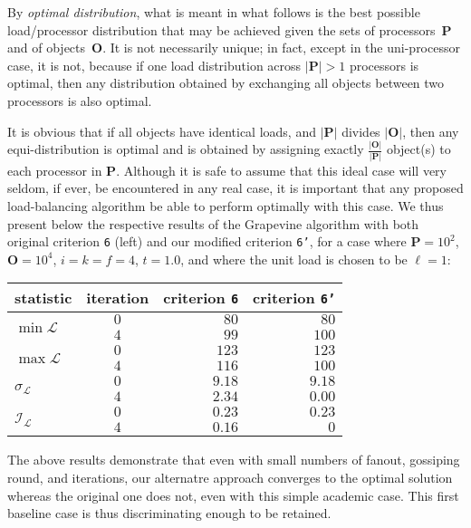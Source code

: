 By \emph{optimal distribution}, what is meant in what follows is
the best possible load/processor distribution that may be achieved given
the sets of processors~$\mathbf{P}$ and of objects~$\mathbf{O}$.
It is not necessarily unique; in fact, except in the uni-processor
case, it is not, because if one load distribution across
$\vert{\mathbf{P}}\vert>1$ processors is optimal, then any
distribution obtained by exchanging all objects between two processors
is also optimal.

It is obvious that if all objects have identical loads, and
$\vert\mathbf{P}\vert$ divides $\vert\mathbf{O}\vert$, then any
equi-distribution is optimal and is obtained by assigning exactly
$\tfrac{\vert\mathbf{O}\vert}{\vert\mathbf{P}\vert}$ object(s) to each
processor in $\mathbf{P}$.
Although it is safe to assume that this ideal case will very seldom,
if ever, be encountered in any real case, it is important that any
proposed load-balancing algorithm be able to perform optimally with
this case. We thus present below the respective results of the
Grapevine algorithm with both original criterion \texttt{6} (left) and
our modified criterion \texttt{6'}, for a case where
$\mathbf{P}=10^2$, $\mathbf{O}=10^4$, $i=k=f=4$, $t=1.0$, and where
the unit load is chosen to be $\ell=1$:
\begin{center}
\begin{tabular}{lcrr}
\hline
statistic & iteration & criterion \texttt{6} & criterion \texttt{6'} \\
\hline\hline
\multirow{2}{*}{$\min{\mathcal{L}}$}
&$0$ &$80$   &$80$   \\ &$4$ &$99$    &$100$ \\\hline
\multirow{2}{*}{$\max{\mathcal{L}}$}
&$0$ &$123$  &$123$  \\ &$4$ &$116$   &$100$ \\\hline
\multirow{2}{*}{$\sigma_{\mathcal{L}}$}
&$0$ &$9.18$ &$9.18$ \\ &$4$ &$2.34$  &$0.00$ \\\hline
\multirow{2}{*}{$\mathcal{I}_\mathcal{L}$}
&$0$ &$0.23$ &$0.23$ \\ &$4$ &$0.16$  &$0$ \\\hline
\end{tabular}
\end{center}
The above results demonstrate that even with small numbers of fanout,
gossiping round, and iterations, our alternatre approach converges to
the optimal solution whereas the original one does not, even with this
simple academic case. This first baseline case is thus discriminating
enough to be retained.

